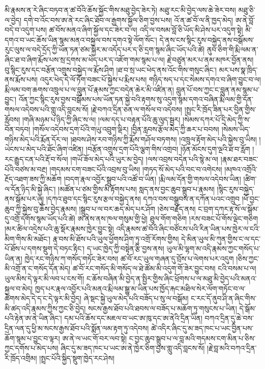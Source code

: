 \documentclass{article}
\begin{document}
མི་རྣམས་ན་རེ་ཞིང་བཏབ་ན་ཚ་བོའི་ཆོས་སྐྱོང་གིས་མཐུ་བྱེད་ཟེར་ཏེ། མཐུ་རང་མི་བྱེད་ལས་ཆེ་ཟེར་བས། མཐུ་ཅི་ལ་བྱེད། དགེ་བ་འོང་བས་ཨ་ནེ་རང་ཞིང་ཐོབ་ལ་རྒྱགས་སྐྱོལ་ཅིག་བྱས་པས། འོ་ན་ཚ་བོ་ལ་ནི་ཁྱད་མེད། ཨ་ནེ་བློ་བདེ་བ་འདུག་པས། ཚ་བོས་མནའ་ཞིག་སྐྱོལ་དང་ཟེར་བ་ལ། འདི་ལ་བསམ་བློ་ཅི་ཡོད་མི་ཤེས་པར་འདུག་སྟེ། མི་དགའ་བ་ཡང་ཆོས་ཡིན་སྙམ་མནའ་བསྐྱལ་བས་དགའ་སྟེ་ལོག་སོང་། དེ་ནས་ངས་སྙིང་རུས་བསྐྱེད་ནས་བསྒོམས་རུང་ལུས་ལ་བདེ་དྲོད་ཀྱི་ཡོན་ཏན་ཙམ་སྐྱེར་མ་འདོད་པར་ད་ཅི་དྲག་སྙམ་ཞིང་ཡོད་པའི་ཚེ། ནུབ་ཅིག་གི་རྨི་ལམ་ན་ཞིང་ཐ་བ་ཞིག་རྨོས་པས་སྲ་དྲགས་མ་ཕེད་པར་ད་འཇོག་གམ་སྙམ་པ་ལ། རྗེ་བཙུན་མར་པ་ནམ་མཁར་བྱོན་ནས། བུ་སྙིང་རུས་དང་བརྩོན་འགྲུས་བསྐྱེད་ལ་རྨོས་ཤིག །ཐ་བ་སྲ་ཡང་ཕེད་ནས་འོང་གིས་གསུང་ཞིང་། མར་པས་སྣ་ཁྲིད་ནས་རྨོས་པས། འདུར་ཕེད་དེ་ལོ་ཏོག་བཟང་པོ་སྐྱེས་པ་རྨིས་པས། གཉིད་སད་པ་དང་སེམས་དགའ་བ་ཞིག་བྱུང་བ་ལ། རྨི་ལམ་བག་ཆགས་འཁྲུལ་པ་ལ་བླུན་པོ་རྣམས་ཀྱང་བདེན་ཆེར་མི་འཛིན་ན། བླུན་པོ་བས་ཀྱང་ང་བླུན་ནམ་སྙམ་པ་བྱུང་། འོན་ཀྱང་སྙིང་རུས་བྱས་བསྒོམས་པས་ཡོན་ཏན་སྐྱེ་བའི་རྟགས་སུ་འདུག་སྙམ་དགའ་བཞིན་རྨི་ལམ་གྱི་དོན་གསལ་འདེབས་པའི་གླུ་འདི་བླངས་སོ། །རྗེ་བཀའ་དྲིན་ཅན་ལ་གསོལ་བ་འདེབས། །སྤྲང་རི་ཁྲོད་ཟིན་པར་བྱིན་གྱིས་རློབས། །གཞི་མཉམ་པ་ཉིད་ཀྱི་ཞིང་ས་ལ། །ལམ་དད་པ་བརྟན་པོའི་ཆུ་ལུད་སྦྱར། །སེམས་དཀར་པོ་དྲི་མེད་ཀྱི་ས་བོན་བཏབ། །གསོལ་འདེབས་དྲག་པོའི་གཡུ་འབྲུག་ལྡིར། །བྱིན་རླབས་རྩོལ་མེད་ཀྱི་ཆར་པ་བབས། །སེམས་ཡིད་གཉིས་མེད་པའི་རྨོན་དོར་ལ། །ཐབས་ཤེས་རབ་གཉིས་ཀྱི་རྨོས་གཤོལ་བཏགས། །འཁྲུལ་རྟོག་མེད་པའི་སྐྱེས་བུ་ཡིས། །ཡེངས་པ་མེད་པའི་ཐོང་ཞིག་འཛིན། །བརྩོན་འགྲུས་དྲག་པོའི་ལྕག་གིས་འགྲབ། །ཉོན་མོངས་དུག་ལྔའི་ཐ་བ་རློག །རང་རྒྱུད་ངན་པའི་རྡོ་བ་སོལ། །གཡོ་ཟོལ་མེད་པའི་ཡུར་མ་བྱེད། །ལས་འབྲས་བདེན་པའི་སྙེ་མ་ལ། །རྣམ་ཐར་བཟང་པོའི་བཙས་མ་བརྔ། །གདམས་ངག་བཟང་པོའི་འབྲས་བུ་ཡིས། །གཏད་སོ་མེད་པའི་བང་བ་འགེངས། །མཁའ་འགྲོའི་རྔོད་འཐག་ཟས་ཀྱི་མཆོག །བདག་རྣལ་འབྱོར་སྒྲུབ་པའི་འཚོ་བ་ཡིན། །རྨི་ལམ་དོན་གྱི་གསལ་འདེབས་ཡིན། །ཚིག་ལ་དོན་ཉིད་མི་སྐྱེ་ཞིང་། །མཚོན་པ་ཙམ་གྱིས་མི་རྟོགས་པས། སླད་ནས་བྱང་ཆུབ་སྒྲུབ་པ་རྣམས། །སྙིང་རུས་བསྐྱེད་ནས་སྒོམ་པར་ཞུ། །དཀའ་ཐུབ་དང་སྙིང་རུས་རྩལ་བསྐྱེད་ནས། དཀའ་བས་བསྒྲུབས་ན་དཀོན་པའང་འགྲུབ །ཕོ་བྱང་ཆུབ་ཀྱི་སྐྱེས་བུ་ཆོས་བྱེད་རྣམས། །སྒྲུབ་པ་ལ་བར་ཆད་མེད་པར་ཤོག །ཅེས་བརྗོད་ནས། ང་བྲག་དཀར་རྟ་སོ་ལ་སྒོམ་དུ་འགྲོ་དགོས་སྙམ་ཡོད་པའི་ཚེ། ཨ་ནེས་ནས་ཁལ་གསུམ་གྱི་ཕྱེ། ཐུལ་གོག་གཅིག །རས་བཟང་པོ་གོས་ལྡེང་གཅིག །མར་ཚིལ་འདྲེས་པའི་ཆུ་སྡོར་རྣམས་ཁྱེར་བྱུང་སྟེ། འདི་རྣམས་ཚ་བོའི་ཞིང་བཙོངས་པའི་རིན་ཡིན་པས་ཁྱེར་ལ་ངའི་མིག་གིས་མི་མཐོང་། རྣ་བས་མི་ཐོས་པའི་ཡུལ་ཕྱོགས་ཤིག་ཏུ་འགྲོ་རོགས་གྱིས། དེ་མིན་ཡུལ་མི་ཀུན་གྱིས་ང་ལ་དང་པོ་ཐོས་པ་དགས་སྡུག་དེ་བཏང་རྟིང་། ད་ཡང་ཁྱེད་ཀྱི་བསྟེན་རྩི་བྱས་ནས། ཡུལ་མི་ལྷག་མ་འདི་རྣམས་ཀྱང་གསོད་པ་ཡིན་ན། ཁྱེད་རང་གཉིས་ཀ་གསོད་གཏོང་ཟེར་བས། ཚ་བོ་རང་ཡུལ་གཞན་དུ་བྲོས་པ་ལེགས་པར་འདུག །ཅིས་ཀྱང་མི་འགྲོ་ན་ང་གསོད་དོན་མེད། ཚ་བོ་རང་གསོད་མི་གསོད་ལ་ཐེ་ཚོམ་མི་འདུག་གོ་ཟེར་བྱུང་བས། ངའི་བསམ་པ་ལ། ཡུལ་མིས་དེ་ལྟར་མི་ལབ་པ་ངས་གོ། ང་ཆོས་བཞིན་མི་བྱེད་ན་སྤྱིར་གྱིས་ཞིང་ཕྲོགས་པ་ལ་མཐུ་མི་བྱེད་པའི་མནའ་སྐྱལ་བ་མེད། ཁྱད་པར་རྣལ་འབྱོར་པའི་མནའ་རྨི་ལམ་སྒྱུ་མ་ཡིན་པས་ཁྱོད་རྐང་མཐིལ་སེར་ལོག་གཏོང་བ་ལ་ཚེགས་མེད་དེ་ད་ང་དེ་ལྟར་མི་བྱེད། ཞེ་སྡང་སྐྱེ་ཡུལ་མེད་པའི་བཟོད་པ་སུ་ལ་བསྒོམ། ང་རང་དོ་ནུབ་ཤི་ན་ཞིང་གིས་མི་ཚད་འདི་རྣམས་ཀྱིས་ཀྱང་ཅི་བྱེད། སངས་རྒྱས་ཐོབ་པའི་ཐབས་ལ་བཟོད་པ་མཆོག་ཏུ་གསུངས་པ་ཡིན། དེ་སྒོམ་པའི་རྟེན་ཨ་ནེ་ཡིན་ཞིང་། དམ་པའི་ཆོས་དང་མཇལ་བ་ཡང་ཨ་ཁུ་དང་ཨ་ནེའི་དྲིན་ཡིན། བཀའ་དྲིན་དུ་ཆེ་བས་དྲིན་ལན་དུ་ཕྱི་མ་སངས་རྒྱས་ཐོབ་པའི་སྨོན་ལམ་རྟག་ཏུ་འདེབས། ཚེ་འདིར་ཞིང་དུ་མ་ཟད་ཁང་པ་ཡང་བྱིན་པས་ཆོག་སྙམ་པ་བྱུང་བ་ལྟར། ཨ་ནེ་ལ་ཡང་གོ་བར་ལབ་སྟེ། ང་བྱང་ཆུབ་སྒྲུབ་པ་ལ་བླ་མའི་གདམས་ངག་མིན་པ་ཅིས་ཀྱང་དགོས་པ་མེད་པས། ཞིང་དུ་མ་ཟད་ཁང་པ་ཡང་ཨ་ནེ་ཁྱེར་ཅིག་བྱས་གླུ་འདི་བླངས་སོ། །རྗེ་བླ་མའི་བཀའ་དྲིན་རི་ཁྲོད་འགྲིམ། །སྤྲང་པོའི་སྐྱིད་སྡུག་ཁྱེད་རང་ཤེས། 
\end{document}
